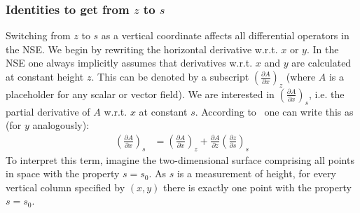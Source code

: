 \subsubsection{Identities to get from $z$ to $s$}
Switching from $z$ to $s$ as a vertical coordinate affects all differential operators in the NSE.%
We begin by rewriting the horizontal derivative w.r.t. $x$ or $y$.
In the NSE one always implicitly assumes that derivatives w.r.t. $x$ and $y$ are calculated at constant height $z$.
This can be denoted by a subscript $\left(\frac{\partial A}{\partial x}\right)_z$ (where $A$ is a placeholder for any scalar or vector field).
We are interested in $\left(\frac{\partial A}{\partial x}\right)_s$, i.e. the partial derivative of $A$ w.r.t. $x$ at constant $s$.
According to~\cite{kasahara1974various} one can write this as (for $y$ analogously):
\begin{align*}
\left(\frac{\partial A}{\partial x}\right)_s &= \left( \frac{\partial A}{\partial x}\right)_z + \frac{\partial A}{\partial z}\left(\frac{\partial z}{\partial s}\right)_s
\end{align*}
To interpret this term, imagine the two-dimensional surface comprising all points in space with the property $s=s_0$.
As $s$ is a measurement of height, for every vertical column specified by $(x,y)$ there is exactly one point with the property $s=s_0$.

